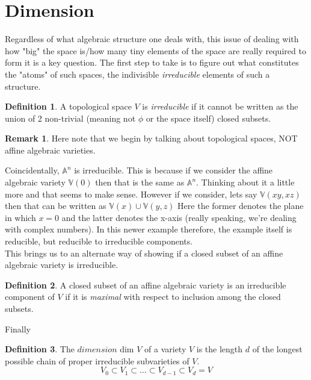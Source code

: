 \documentclass[12pt]{book}
\theoremstyle{definition}
\newtheorem*{defn}{Definition}
\newtheorem*{rem}{Remark}
\begin{document}
\section{Dimension}
Regardless of what algebraic structure one deals with, this issue of dealing with how "big" the space is/how many tiny elements of the space are really required to form it is a key question. The first step to take is to figure out what constitutes the "atoms" of such spaces, the indivisible \textit{irreducible} elements of such a structure.
\begin{defn}
    A topological space $V$ is \textit{irreducible} if it cannot be written as the union of 2 non-trivial (meaning not $\phi$ or the space itself) closed subsets.
\end{defn}
\begin{rem}
    Here note that we begin by talking about topological spaces, NOT affine algebraic varieties.
\end{rem}
Coincidentally, $\mathbb{A}^n$ is irreducible. This is because if we consider the affine algebraic variety $\mathbb{V}(0)$ then that is the same as $\mathbb{A}^n$. Thinking about it a little more and that seems to make sense. However if we consider, lets say $\mathbb{V}(xy, xz)$ then that can be written as $\mathbb{V}(x) \cup \mathbb{V}(y, z)$ Here the former denotes the plane in which $x=0$ and the latter denotes the x-axis (really speaking, we're dealing with complex numbers). In this newer example therefore, the example itself is reducible, but reducible to irreducible components. \\
This brings us to an alternate way of showing if a closed subset of an affine algebraic variety is irreducible.
\begin{defn}
    A closed subset of an affine algebraic variety is an irreducible component of $V$ if it is \textit{maximal} with respect to inclusion among the closed subsets.
\end{defn}
Finally
\begin{defn}
    The $dimension$ dim $V$ of a variety $V$ is the length $d$ of the longest possible chain of proper irreducible subvarieties of $V$. 
    $$V_0 \subset V_1 \subset \ldots \subset V_{d-1} \subset V_d = V $$
\end{defn}
\end{document}
